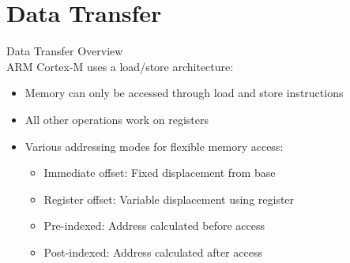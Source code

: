 \section{Data Transfer}

\begin{concept}{Data Transfer Overview}\\
ARM Cortex-M uses a load/store architecture:
\begin{itemize}
  \item Memory can only be accessed through load and store instructions
  \item All other operations work on registers
  \item Various addressing modes for flexible memory access:
    \begin{itemize}
      \item Immediate offset: Fixed displacement from base
      \item Register offset: Variable displacement using register
      \item Pre-indexed: Address calculated before access
      \item Post-indexed: Address calculated after access
    \end{itemize}
\end{itemize}
\end{concept}

